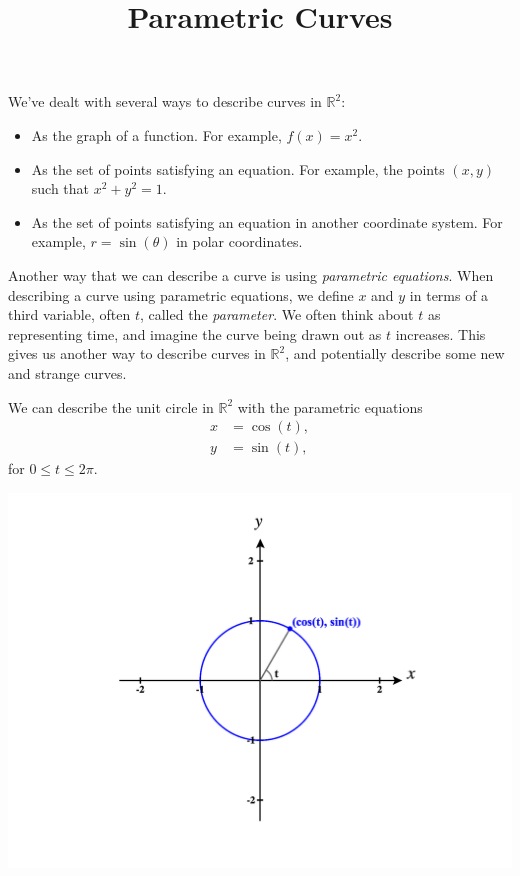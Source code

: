 \documentclass{ximera}
\title{Parametric Curves}
\begin{document}
\begin{abstract}
\end{abstract}
\maketitle


We've dealt with several ways to describe curves in $\mathbb{R}^2$:
\begin{itemize}
\item As the graph of a function. For example, $f(x) = x^2$.
\item As the set of points satisfying an equation. For example, the points $(x,y)$ such that $x^2 + y^2 = 1$.
\item As the set of points satisfying an equation in another coordinate system. For example, $r = \sin(\theta)$ in polar coordinates.
\end{itemize}

Another way that we can describe a curve is using \emph{parametric equations}. When describing a curve using parametric equations, we define $x$ and $y$ in terms of a third variable, often $t$, called the \emph{parameter}. We often think about $t$ as representing time, and imagine the curve being drawn out as $t$ increases. This gives us another way to describe curves in $\mathbb{R}^2$, and potentially describe some new and strange curves.

We can describe the unit circle in $\mathbb{R}^2$ with the parametric equations
\begin{align*}
x & = \cos(t),\\
y & = \sin(t),
\end{align*}
for $0\leq t \leq 2\pi$.

\begin{image}
\includegraphics[width = \textwidth]{CalcPlot3D-unit_circle}
\end{image}
\end{document}
